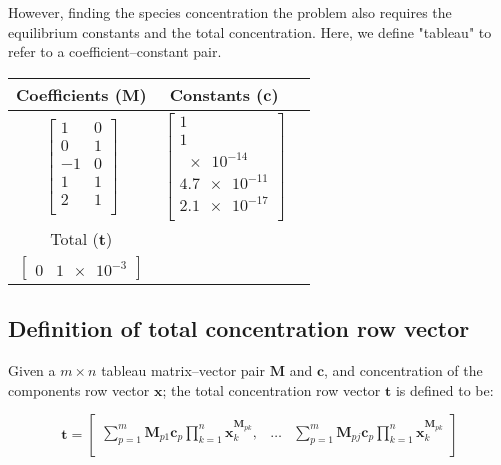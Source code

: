 \documentclass{article}
\newcommand{\matr}[1]{\bm{#1}}
\newcommand{\vect}[1]{\bm{#1}}
\begin{document}
However, finding the species concentration the problem also requires the equilibrium constants and the total concentration. Here, we define "tableau" to refer to a coefficient--constant pair.
\begin{center}
\begin{tabular}{c|c|c}
    Coefficients ($\matr{M}$) & Constants ($\vect{c}$) \\
    \hline
    $\begin{bmatrix}
        1 & 0\\
        0 & 1\\
        -1 & 0\\
        1 & 1\\
        2 & 1\\
    \end{bmatrix}$ &
    $\begin{bmatrix}
        1\\
        1\\
        \num{e-14}\\
        \num{4.7e-11}\\
        \num{2.1e-17}\\
    \end{bmatrix}$ \\
    \hline
    Total ($\vect{t}$)\\
    \hline
    $\begin{bmatrix}
        0 & \num{1e-3}
    \end{bmatrix}$
    \end{tabular}
\end{center}

\subsection{Definition of total concentration row vector}

Given a $m \times n$ tableau matrix--vector pair $\matr{M}$ and $\vect{c}$, and concentration of the components row vector $\vect{x}$; the total concentration row vector $\vect{t}$ is defined to be:

\begin{equation*}
  \vect{t}=
 \begin{bmatrix}
  \sum_{p=1}^{m} \matr{M}_{p1} \vect{c}_p \prod_{k=1}^{n} \vect{x}_k^{\matr{M}_{pk}}, &
  \hdots &
  \sum_{p=1}^{m} \matr{M}_{pj} \vect{c}_p \prod_{k=1}^{n} \vect{x}_k^{\matr{M}_{pk}} \\
\end{bmatrix}
\end{equation*}
\end{document}
